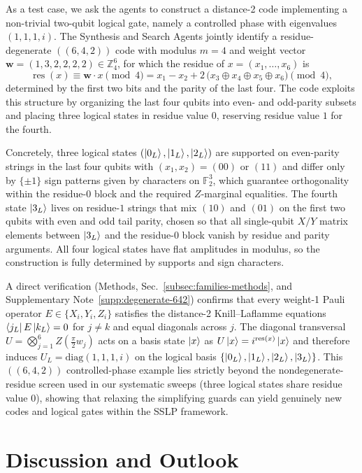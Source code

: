 \documentclass[pdflatex,sn-nature]{sn-jnl}%
\theoremstyle{thmstyleone}%
\theoremstyle{thmstyletwo}%
\theoremstyle{thmstylethree}%
\begin{document}
As a test case, we ask the agents to construct a distance-2 code implementing a non-trivial two-qubit logical gate, namely a controlled phase with eigenvalues $(1,1,1,i)$. 
The Synthesis and Search Agents jointly identify a residue-degenerate $((6,4,2))$ code with modulus $m=4$ and weight vector $\mathbf w=(1,3,2,2,2,2)\in\mathbb Z_4^6$, for which the residue of $x=(x_1,\dots,x_6)$ is
\[
  \operatorname{res}(x)\equiv \mathbf w\cdot x \pmod 4
  = x_1 - x_2 + 2\,\bigl(x_3\oplus x_4\oplus x_5\oplus x_6\bigr)\pmod 4,
\]
determined by the first two bits and the parity of the last four. 
The code exploits this structure by organizing the last four qubits into even- and odd-parity subsets and placing three logical states in residue value $0$, reserving residue value $1$ for the fourth.

Concretely, three logical states $(\ket{0_L},\ket{1_L},\ket{2_L})$ are supported on even-parity strings in the last four qubits with $(x_1,x_2)=(00)$ or $(11)$ and differ only by $\{\pm1\}$ sign patterns given by characters on $\mathbb F_2^3$, which guarantee orthogonality within the residue-$0$ block and the required $Z$-marginal equalities. 
The fourth state $\ket{3_L}$ lives on residue-$1$ strings that mix $(10)$ and $(01)$ on the first two qubits with even and odd tail parity, chosen so that all single-qubit $X/Y$ matrix elements between $\ket{3_L}$ and the residue-$0$ block vanish by residue and parity arguments. 
All four logical states have flat amplitudes in modulus, so the construction is fully determined by supports and sign characters.

A direct verification (Methods, Sec.~\ref{subsec:families-methods}, and Supplementary Note~\ref{supp:degenerate-642}) confirms that every weight-1 Pauli operator $E\in\{X_i,Y_i,Z_i\}$ satisfies the distance-2 Knill--Laflamme equations
$\bra{j_L}E\ket{k_L}=0$ for $j\neq k$ and equal diagonals across $j$. 
The diagonal transversal $U=\bigotimes_{j=1}^6 Z\!\left(\tfrac{\pi}{2} w_j\right)$
acts on a basis state $\ket{x}$ as $U\ket{x}=i^{\operatorname{res}(x)}\ket{x}$ and therefore induces $U_L=\mathrm{diag}(1,1,1,i)$ on the logical basis $\{\ket{0_L},\ket{1_L},\ket{2_L},\ket{3_L}\}$. 
This $((6,4,2))$ controlled-phase example lies strictly beyond the nondegenerate-residue screen used in our systematic sweeps (three logical states share residue value $0$), showing that relaxing the simplifying guards can yield genuinely new codes and logical gates within the SSLP framework. 

\section{Discussion and Outlook}
\label{sec:discuss}
\end{document}
